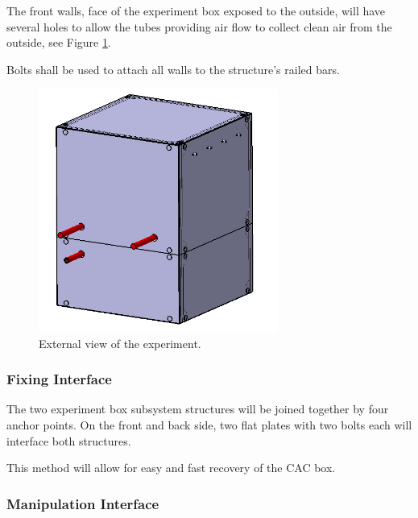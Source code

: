 The front walls, face of the experiment box exposed to the outside, will have several holes to allow the tubes providing air flow to collect clean air from the outside, see Figure \ref{front_wall_holes}.


Bolts shall be used to attach all walls to the structure's railed bars.


\begin{figure}[!ht]
    \centering
    \includegraphics[width=0.7\textwidth]{4-experiment-design/img/frontal_holes.jpg}
    \caption{External view of the experiment.}
    \label{front_wall_holes}
\end{figure}

\pagebreak
\subsubsection{Fixing Interface}

The two experiment box subsystem structures will be joined together by four anchor points. On the front and back side, two flat plates with two bolts each will interface both structures. 

This method will allow for easy and fast recovery of the CAC box. 
 


\pagebreak
\subsubsection{Manipulation Interface}

